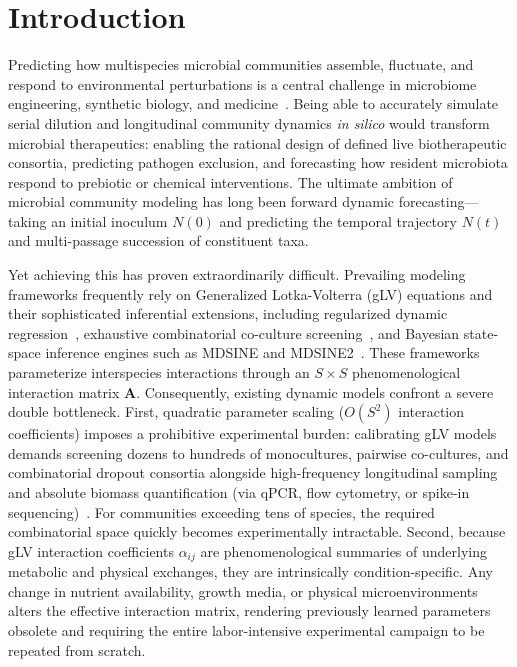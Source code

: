 \section{Introduction}
\label{sec:intro}

Predicting how multispecies microbial communities assemble, fluctuate, and respond to environmental perturbations is a central challenge in microbiome engineering, synthetic biology, and medicine~\cite{venturelli2018deciphering,goldford2018emergent}. Being able to accurately simulate serial dilution and longitudinal community dynamics \textit{in silico} would transform microbial therapeutics: enabling the rational design of defined live biotherapeutic consortia, predicting pathogen exclusion, and forecasting how resident microbiota respond to prebiotic or chemical interventions. The ultimate ambition of microbial community modeling has long been forward dynamic forecasting---taking an initial inoculum $N(0)$ and predicting the temporal trajectory $N(t)$ and multi-passage succession of constituent taxa. 

Yet achieving this has proven extraordinarily difficult. Prevailing modeling frameworks frequently rely on Generalized Lotka-Volterra (gLV) equations and their sophisticated inferential extensions, including regularized dynamic regression~\cite{stein2013ecological}, exhaustive combinatorial co-culture screening~\cite{venturelli2018deciphering}, and Bayesian state-space inference engines such as MDSINE and MDSINE2~\cite{bucci2016mdsine,gibson2025mdsine2}. These frameworks parameterize interspecies interactions through an $S \times S$ phenomenological interaction matrix $\mathbf{A}$. Consequently, existing dynamic models confront a severe double bottleneck. First, quadratic parameter scaling ($O(S^2)$ interaction coefficients) imposes a prohibitive experimental burden: calibrating gLV models demands screening dozens to hundreds of monocultures, pairwise co-cultures, and combinatorial dropout consortia alongside high-frequency longitudinal sampling and absolute biomass quantification (via qPCR, flow cytometry, or spike-in sequencing)~\cite{venturelli2018deciphering,gibson2025mdsine2}. For communities exceeding tens of species, the required combinatorial space quickly becomes experimentally intractable. Second, because gLV interaction coefficients $\alpha_{ij}$ are phenomenological summaries of underlying metabolic and physical exchanges, they are intrinsically condition-specific. Any change in nutrient availability, growth media, or physical microenvironments alters the effective interaction matrix, rendering previously learned parameters obsolete and requiring the entire labor-intensive experimental campaign to be repeated from scratch.

